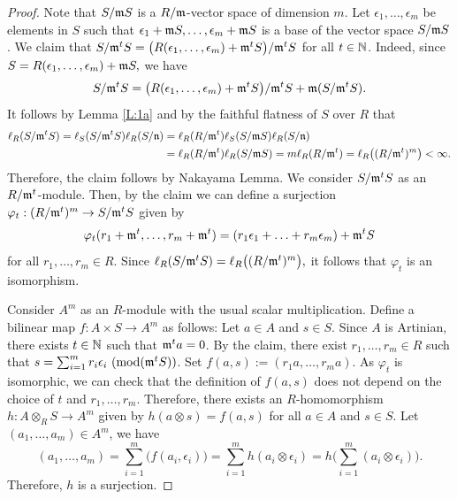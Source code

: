 \documentclass[a4papersize]{article}
\begin{document}
\begin{proof} Note that $S/\frak mS$ is a $R/\frak m$-vector space of dimension $m$.  Let $\epsilon_1, \ldots , \epsilon_m$ be elements in $S$ such that $\epsilon_1+\frak mS, \ldots , \epsilon_m+\frak mS$ is a  base of  the vector space $S/\frak mS$. We claim that $S/\frak m^tS=\big(R(\epsilon_1, \ldots , \epsilon_m)+\frak m^tS\big)/\frak m^tS$ for all $t\in\Bbb N$. Indeed, since $S=R(\epsilon_1, \ldots , \epsilon_m)+\frak mS,$ we have 
$$S/\frak m^tS=\big(R(\epsilon_1, \ldots , \epsilon_m)+\frak m^tS\big)/\frak m^tS + \frak m(S/\frak m^tS).$$ 
It follows by Lemma \ref{L:1a} and by the faithful flatness of $S$ over $R$ that 
\begin{align}\ell_R(S/\frak m^tS)=\ell_S(S/\frak m^tS)\ell_R(S/\frak n)&=\ell_R(R/\frak m^t)\ell_S(S/\frak mS)\ell_R(S/\frak n)\notag\\
&=\ell_R(R/\frak m^t)\ell_R(S/\frak mS)=m\ell_R(R/\frak m^t)=\ell_R\big((R/\frak m^t)^m\big)<\infty.\notag\end{align} Therefore, the claim follows by Nakayama Lemma. We consider  $S/\frak m^tS$ as an $R/\frak m^t$-module.  Then, by the claim we can define a surjection  $\varphi_t: (R/\frak m^t)^m\rightarrow S/\frak m^tS$ given by $$\varphi_t(r_1+\frak m^t, \ldots , r_m+\frak m^t)=(r_1\epsilon_1+ \ldots +r_m\epsilon_m)+\frak m^tS$$ for all $r_1, \ldots , r_m\in R.$ Since $\ell_R(S/\frak m^tS)=\ell_R\big((R/\frak m^t)^m\big),$ it follows that $\varphi_t$ is an isomorphism.


  Consider $A^m$ as an $R$-module with the usual scalar multiplication. Define a bilinear map $f: A\times S\rightarrow A^m$ as follows: Let $a\in A$ and $s\in S.$ Since $A$ is Artinian, there exists $t\in\Bbb N$ such that $\frak m^ta=0$. By the claim, there exist $r_1, \ldots , r_m\in R$ such that $s=\sum_{i=1}^m r_i\epsilon_i \ ({\rm mod} (\frak m^tS))$. Set $f(a, s):=(r_1a, \ldots , r_ma).$ As $\varphi_t$ is isomorphic,  we can check that the  definition of  $f(a, s)$ does not depend on the choice of  $t$ and $r_1, \ldots , r_m$.  Therefore, there exists an $R$-homomorphism $h: A \otimes_RS\rightarrow A^m$ given by $h(a\otimes s)=f(a, s)$ for all $a\in A$ and $s\in S.$ Let $(a_1, \ldots , a_m)\in A^m$, we have 
 $$(a_1, \ldots , a_m)=\sum_{i=1}^m\big(f(a_i,\epsilon_i)\big)=\sum_{i=1}^m h(a_i\otimes \epsilon_i)=h\big(\sum_{i=1}^m(a_i\otimes \epsilon_i)\big).$$ Therefore, $h$ is a surjection. 


\end{proof}
\end{document}
